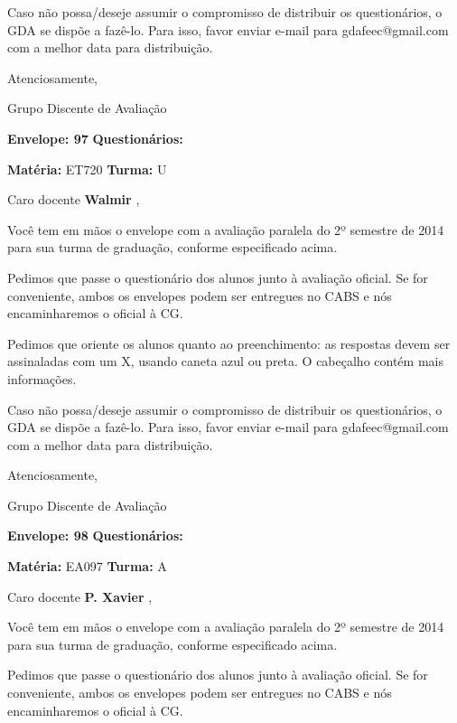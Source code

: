 \documentclass[a5paper]{letter}
\begin{document}
	Caso não possa/deseje assumir o compromisso de distribuir os questionários, o GDA se dispõe a fazê-lo. Para isso, favor enviar e-mail para gdafeec@gmail.com com a melhor data para distribuição.


Atenciosamente, 

Grupo Discente de Avaliação

\vspace{0.5cm}

{\bf Envelope: 97 }		\hfill	{\bf Questionários:} \hspace{2cm}

\newpage
\thispagestyle{empty}

\hfill {\bf Matéria:} ET720 {\bf Turma:} U

Caro docente {\bf Walmir }, 

	Você tem em mãos o envelope com a avaliação paralela do 2º semestre de 2014 para sua turma de graduação, conforme especificado acima.

	Pedimos que passe o questionário dos alunos junto à avaliação oficial. Se for conveniente, ambos os envelopes podem ser entregues no CABS e nós encaminharemos o oficial à CG.

Pedimos que oriente os alunos quanto ao preenchimento: as respostas devem ser assinaladas com um X, usando caneta azul ou preta. O cabeçalho contém mais informações.

	Caso não possa/deseje assumir o compromisso de distribuir os questionários, o GDA se dispõe a fazê-lo. Para isso, favor enviar e-mail para gdafeec@gmail.com com a melhor data para distribuição.


Atenciosamente, 

Grupo Discente de Avaliação

\vspace{0.5cm}

{\bf Envelope: 98 }		\hfill	{\bf Questionários:} \hspace{2cm}

\newpage
\thispagestyle{empty}

\hfill {\bf Matéria:} EA097 {\bf Turma:} A

Caro docente {\bf P. Xavier }, 

	Você tem em mãos o envelope com a avaliação paralela do 2º semestre de 2014 para sua turma de graduação, conforme especificado acima.

	Pedimos que passe o questionário dos alunos junto à avaliação oficial. Se for conveniente, ambos os envelopes podem ser entregues no CABS e nós encaminharemos o oficial à CG.
\end{document}

